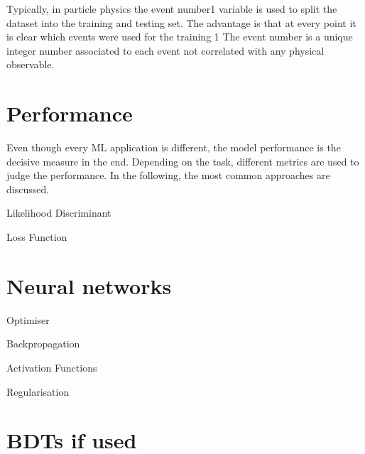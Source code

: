 Typically, in particle physics the event number1 variable is used to split the dataset into the training
and testing set. The advantage is that at every point it is clear which events were used for the training
1 The event number is a unique integer number associated to each event not correlated with any physical observable.
\section{Performance}

Even though every ML application is different, the model performance is the decisive measure in the
end. Depending on the task, different metrics are used to judge the performance. In the following,
the most common approaches are discussed.

Likelihood Discriminant

Loss Function

\section{Neural networks}

Optimiser

Backpropagation

Activation Functions

Regularisation

\section{BDTs if used}